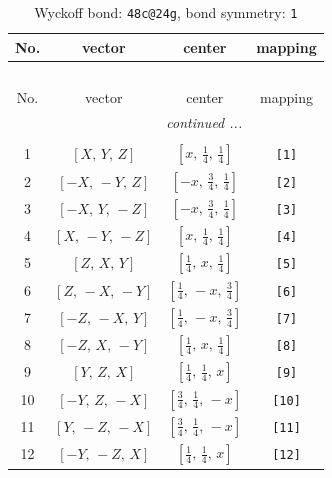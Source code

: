 \documentclass[fleqn,8pt]{jsarticle}
\begin{document}
\begin{longtable}{cccc}
\caption{Wyckoff bond: {\tt 48c@24g}, bond symmetry: {\tt 1}}
 \\
 \hline \hline
No. & vector & center & mapping \\ \hline \endfirsthead

\multicolumn{3}{l}{\tablename\ \thetable{}} \\
 \hline \hline
No. & vector & center & mapping \\ \hline \endhead

 \hline \hline
\multicolumn{3}{r}{\footnotesize\it continued ...} \\ \endfoot

 \hline \hline
\multicolumn{3}{r}{} \\ \endlastfoot

1 & $\left[ X,\, Y,\, Z \right]$ & $\left[ x,\, \frac{1}{4},\, \frac{1}{4} \right]$ & {\tt [1]} \\ \hline
2 & $\left[ - X,\, - Y,\, Z \right]$ & $\left[ - x,\, \frac{3}{4},\, \frac{1}{4} \right]$ & {\tt [2]} \\ \hline
3 & $\left[ - X,\, Y,\, - Z \right]$ & $\left[ - x,\, \frac{3}{4},\, \frac{1}{4} \right]$ & {\tt [3]} \\ \hline
4 & $\left[ X,\, - Y,\, - Z \right]$ & $\left[ x,\, \frac{1}{4},\, \frac{1}{4} \right]$ & {\tt [4]} \\ \hline
5 & $\left[ Z,\, X,\, Y \right]$ & $\left[ \frac{1}{4},\, x,\, \frac{1}{4} \right]$ & {\tt [5]} \\ \hline
6 & $\left[ Z,\, - X,\, - Y \right]$ & $\left[ \frac{1}{4},\, - x,\, \frac{3}{4} \right]$ & {\tt [6]} \\ \hline
7 & $\left[ - Z,\, - X,\, Y \right]$ & $\left[ \frac{1}{4},\, - x,\, \frac{3}{4} \right]$ & {\tt [7]} \\ \hline
8 & $\left[ - Z,\, X,\, - Y \right]$ & $\left[ \frac{1}{4},\, x,\, \frac{1}{4} \right]$ & {\tt [8]} \\ \hline
9 & $\left[ Y,\, Z,\, X \right]$ & $\left[ \frac{1}{4},\, \frac{1}{4},\, x \right]$ & {\tt [9]} \\ \hline
10 & $\left[ - Y,\, Z,\, - X \right]$ & $\left[ \frac{3}{4},\, \frac{1}{4},\, - x \right]$ & {\tt [10]} \\ \hline
11 & $\left[ Y,\, - Z,\, - X \right]$ & $\left[ \frac{3}{4},\, \frac{1}{4},\, - x \right]$ & {\tt [11]} \\ \hline
12 & $\left[ - Y,\, - Z,\, X \right]$ & $\left[ \frac{1}{4},\, \frac{1}{4},\, x \right]$ & {\tt [12]} \\
\end{longtable}
\end{document}
